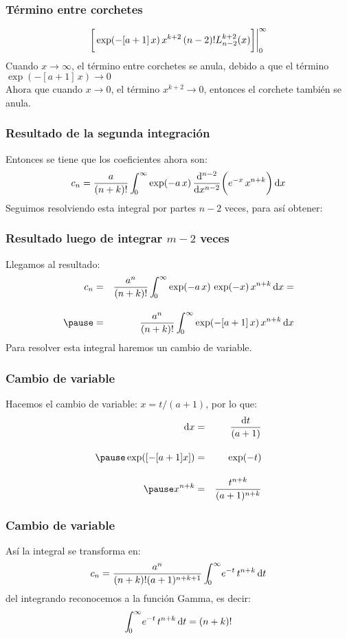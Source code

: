 \documentclass[12pt]{beamer}
\begin{document}
\begin{frame}
\frametitle{Término entre corchetes}
\begin{align*}
\bigg[ \exp(-[a + 1] \, x) \, x^{k+2} \, (n - 2)! \scaleto{L_{n-2}^{k+2}(x)}{3ex} \bigg] \bigg\vert_{0}^{\infty}
\end{align*}
\pause
Cuando $x \to \infty$, el término entre corchetes se anula, debido a que el término $\exp(-[a + 1] \, x) \to 0$
\\
\bigskip
\pause
Ahora que cuando $x \to 0$, el término $x^{k+2} \to  0$, entonces el corchete también se anula.
\end{frame}    
\begin{frame}
\frametitle{Resultado de la segunda integración}
Entonces se tiene que los coeficientes ahora son:
\begin{align*}
c_{n} = \dfrac{a}{(n + k)!} \, \scaleint{5ex}_{\bs 0}^{\infty} \exp( - a \, x) \, \dv[n-2]{x} \bigg( e^{-x} \, x^{n+k} \bigg) \dd{x}
\end{align*}
\pause
Seguimos resolviendo esta integral por partes $n - 2$ veces, para así obtener:
\end{frame}
\begin{frame}
\frametitle{Resultado luego de integrar $m-2$ veces}
Llegamos al resultado:
\pause
\begin{eqnarray*}
c_{n} &=& \dfrac{a^{n}}{(n + k)!} \, \scaleint{5ex}_{\bs 0}^{\infty} \exp( - a \, x) \, \exp(-x) \, x^{n+k} \dd{x} = \\[1em] \pause
&=& \dfrac{a^{n}}{(n + k)!} \, \scaleint{5ex}_{\bs 0}^{\infty} \exp(-[a + 1] \, x) \, x^{n+k} \dd{x}
\end{eqnarray*}
\pause
Para resolver esta integral haremos un cambio de variable.
\end{frame}
\begin{frame}
\frametitle{Cambio de variable}
Hacemos el cambio de variable: $x = t / (a + 1)$, por lo que:
\pause
\begin{eqnarray*}
\dd{x} &=& \dfrac{\dd{t}}{(a + 1)}
\\[1em] \pause
\exp([-[a + 1] x]) &=& \exp(-t) \\[1em] \pause
x^{n+k} &=& \dfrac{t^{n+k}}{(a + 1)^{n+k}}
\end{eqnarray*}
\end{frame}
\begin{frame}
\frametitle{Cambio de variable}
Así la integral se transforma en:
\pause
\begin{align*}
c_{n} = \dfrac{a^{n}}{(n + k)! (a + 1)^{n+k+1}} \, \scaleint{5ex}_{\bs 0}^{\infty} e^{-t} \, t^{n+k} \dd{t}
\end{align*}
\pause
del integrando reconocemos a la función Gamma, es decir:
\pause
\begin{align*}
\scaleint{5ex}_{\bs 0}^{\infty} e^{-t} \, t^{n+k} \dd{t} = (n + k)!
\end{align*}
\end{frame}
\end{document}
